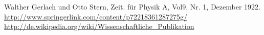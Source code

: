 \begin{thebibliography}{12345}
Walther Gerlach und Otto Stern, Zeit. f\"ur Physik A, Vol9, Nr. 1, Dezember
1922.
\url{http://www.springerlink.com/content/p72218361287275g/}
\url{http://de.wikipedia.org/wiki/Wissenschaftliche_Publikation}
\end{thebibliography}
